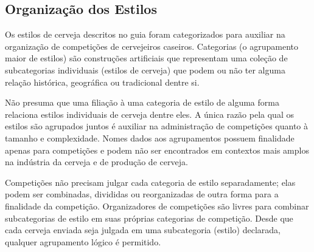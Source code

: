 \subsection*{Organização dos Estilos}
Os estilos de cerveja descritos no guia foram categorizados para auxiliar na organização de competições de cervejeiros caseiros. Categorias (o agrupamento maior de estilos) são construções artificiais que representam uma coleção de subcategorias individuais (estilos de cerveja) que podem ou não ter alguma relação histórica, geográfica ou tradicional dentre si.

Não presuma que uma filiação à uma categoria de estilo de alguma forma relaciona estilos individuais de cerveja dentre eles. A única razão pela qual os estilos são agrupados juntos é auxiliar na administração de competições quanto à tamanho e complexidade. Nomes dados aos agrupamentos possuem finalidade apenas para competições e podem não ser encontrados em contextos mais amplos na indústria da cerveja e de produção de cerveja.

Competições não precisam julgar cada categoria de estilo separadamente; elas podem ser combinadas, divididas ou reorganizadas de outra forma para a finalidade da competição. Organizadores de competições são livres para combinar subcategorias de estilo em suas próprias categorias de competição. Desde que cada cerveja enviada seja julgada em uma subcategoria (estilo) declarada, qualquer agrupamento lógico é permitido.
